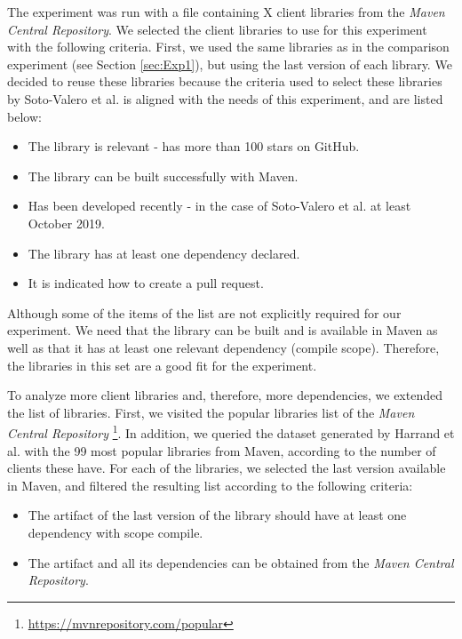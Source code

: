 \blankl
The experiment was run with a file containing X client libraries from the \textit{Maven Central Repository}.  We selected the client libraries to use for this experiment with the following criteria. First, we used the same libraries as in the comparison experiment (see Section \ref{sec:Exp1}), but using the last version of each library. We decided to reuse these libraries because the criteria used to select these libraries by Soto-Valero et al. \cite{soto2020comprehensive} is aligned with the needs of this experiment, and are listed below:

\begin{itemize}
  \item The library is relevant - has more than 100 stars on GitHub.
  \item The library can be built successfully with Maven.
  \item Has been developed recently - in the case of Soto-Valero et al. at least October 2019.
  \item The library has at least one dependency declared.
  \item It is indicated how to create a pull request.
\end{itemize}

Although some of the items of the list are not explicitly required for our experiment. We need that the library can be built and is available in Maven as well as that it has at least one relevant dependency (compile scope). Therefore, the libraries in this set are a good fit for the experiment.

To analyze more client libraries and, therefore, more dependencies, we extended the list of libraries. First, we visited the popular libraries list of the \textit{Maven Central Repository} \footnote{\url{https://mvnrepository.com/popular}}. In addition, we queried the dataset generated by Harrand et al. \cite{Harrand2019} with the 99 most popular libraries from Maven, according to the number of clients these have. For each of the libraries, we selected the last version available in Maven, and filtered the resulting list according to the following criteria:

\begin{itemize}
  \item The artifact of the last version of the library should have at least one dependency with scope compile.
  \item The artifact and all its dependencies can be obtained from the \textit{Maven Central Repository}.
\end{itemize}

